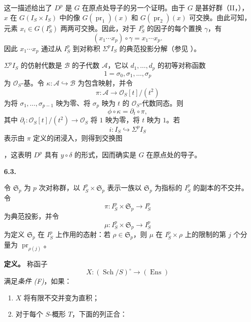 这一描述给出了 \(D^p\) 是 \(G\) 在原点处导子的另一个证明。由于 \(G\) 是甚好群（II，），\(x\) 在 \(G(I_S\times I_S)\) 中的像 \(G(\operatorname{pr}_1)(x)\) 和 \(G(\operatorname{pr}_2)(x)\) 可交换。由此可知，元素 \(x_i\in G(I_S^p)\) 两两可交换。因此，对于 \(I_S^p\) 的因子的每个置换 \(\gamma\)，有
\[
  (x_1\cdots x_p)\circ\gamma=x_1\cdots x_p.
\]
因此 \(x_1\cdots x_p\) 通过从 \(I_S^p\) 到对称积 \(\Sigma^p I_S\) 的典范投影分解（参见 ）。

\(\Sigma^p I_S\) 的仿射代数是 \(\mathcal B\) 的子代数 \(\mathcal A\)，它以 \(d_1,\ldots,d_p\) 的初等对称函数
\[
  1=\sigma_0,\sigma_1,\ldots,\sigma_p
\]
为 \(\mathcal O_S\)-基。令 \(\kappa:\mathcal A\hookrightarrow\mathcal B\) 为包含映射，并令
\[
  \pi:\mathcal A\longrightarrow\mathcal O_S[t]/(t^2)
\]
为将 \(\sigma_1,\ldots,\sigma_{p-1}\) 映为零、将 \(\sigma_p\) 映为 \(t\) 的 \(\mathcal O_S\)-代数同态。则
\[
  \phi\circ\kappa=\partial_t\circ\pi,
\]
其中 \(\partial_t:\mathcal O_S[t]/(t^2)\to\mathcal O_S\) 将 \(1\) 映为零，将 \(t\) 映为 \(1\)。若
\[
  i:I_S\hookrightarrow\Sigma^p I_S
\]
表示由 \(\pi\) 定义的闭浸入，则得到交换图
\begin{center}
  \label{sga3:VIIA:6.2-symbolic-power-commutative-diagram}
  
\end{center}
，这表明 \(D^p\) 具有 \(y\circ\delta\) 的形式，因而确实是 \(G\) 在原点处的导子。

\medskip
\noindent\textbf{6.3.}
\label{sga3:VIIA:6.3}

令 \(\mathfrak S_p\) 为 \(p\) 次对称群，以 \(I_S^p\times\mathfrak S_p\) 表示一族以 \(\mathfrak S_p\) 为指标的 \(I_S^p\) 的副本的不交并。令
\[
  \pi:I_S^p\times\mathfrak S_p\longrightarrow I_S^p
\]
为典范投影，并令
\[
  \mu:I_S^p\times\mathfrak S_p\longrightarrow I_S^p
\]
为定义 \(\mathfrak S_p\) 在 \(I_S^p\) 上作用的态射：若 \(\rho\in\mathfrak S_p\)，则 \(\mu\) 在 \(I_S^p\times\rho\) 上的限制的第 \(j\) 个分量为 \(\operatorname{pr}_{\rho(j)}\)。

\noindent\textbf{定义。}
称函子
\[
  X:(\operatorname{Sch}/S)^\circ\longrightarrow(\operatorname{Ens})
\]
满足\emph{条件 (F)}，如果：
\begin{enumerate}
  \item[\textit{a)}] \(X\) 将有限不交并变为直积；
  \item[\textit{b)}] 对于每个 \(S\)-概形 \(T\)，下面的列正合：
\end{enumerate}
\begin{center}
  \label{sga3:VIIA:6.3-conditionF-equalizer}
  
\end{center}

